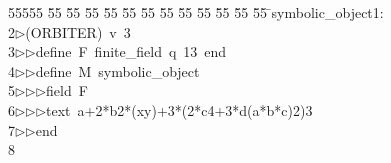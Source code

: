 %
%
\begin{tabbing}
55555 \= 55 \= 55 \= 55 \= 55 \= 55 \= 55 \= 55 \= 55 \= 55 \= 55 \= 55 \= 55 \= \>symbolic\_object1:\\[0pt]
2\>$\triangleright$\>(ORBITER)\ v\ 3\ \\[0pt]
3\>$\triangleright$\>$\triangleright$\>define\ F\ finite\_field\ q\ 13\ end\ \\[0pt]
4\>$\triangleright$\>$\triangleright$\>define\ M\ symbolic\_object\ \\[0pt]
5\>$\triangleright$\>$\triangleright$\>$\triangleright$\>field\ F\ \\[0pt]
6\>$\triangleright$\>$\triangleright$\>$\triangleright$\>text\ a+2*b2*(xy)+3*(2*c4+3*d(a*b*c)2)3\ \\[0pt]
7\>$\triangleright$\>$\triangleright$\>end\\[0pt]
8\>\end{tabbing}
